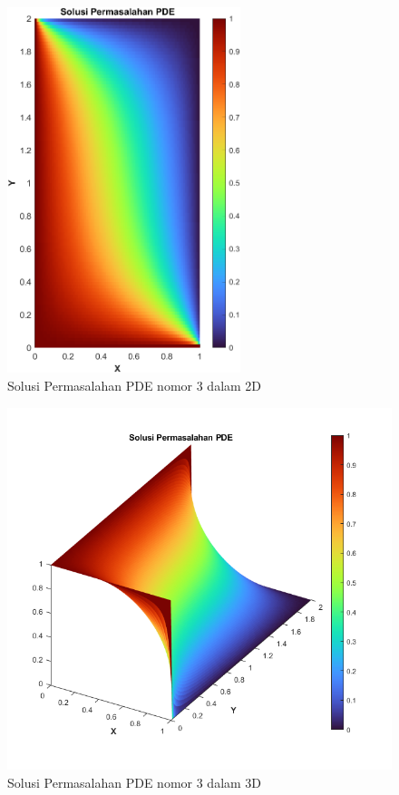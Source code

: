 \documentclass{article}
\begin{document}
\begin{figure} [h]
    \centering
    \includegraphics[width=6.8cm]{image/untitled101.png}
    \caption{Solusi Permasalahan PDE nomor 3 dalam 2D}
    \label{fig:2D}
\end{figure}

\begin{figure} [h]
    \centering
    \includegraphics[width=\textwidth]{image/visualisasi3d2.png}
    \caption{Solusi Permasalahan PDE nomor 3 dalam 3D}
    \label{fig:3D}
\end{figure}

\end{document}
